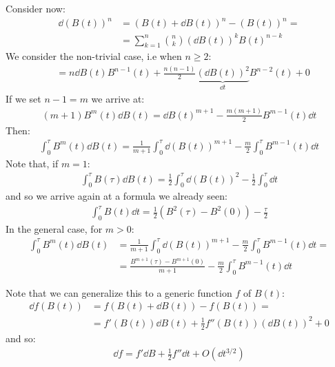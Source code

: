 \documentclass[../template.tex]{subfiles}
\begin{document}
Consider now:
\begin{align*}
    \dd{(B(t))^n} &= (B(t) + \dd{B(t)})^n - (B(t))^n =\\
    &= \sum_{k=1}^n {n\choose k} (\dd{B}(t))^k B(t)^{n-k}
\end{align*}
We consider the non-trivial case, i.e when $n\geq 2$:
\begin{align*}
    &= n \dd{B}(t) B^{n-1}(t)  + \frac{n(n-1)}{2} \underbrace{(\dd{B}(t))^2}_{\dd{t}} B^{n-2}(t) + 0  
\end{align*} 
If we set $n-1 = m$ we arrive at:
\begin{align*}
    (m+1)B^m(t) \dd{B}(t) = \dd{B(t)}^{m+1} - \frac{m(m+1)}{2} B^{m-1}(t) \dd{t} 
\end{align*} 
Then:
\begin{align*}
    \int_0^\tau B^m(t) \dd{B}(t) = \frac{1}{m+1}\int_0^\tau \dd{(B(t))^{m+1}} - \frac{m}{2} \int_0^\tau B^{m-1}(t) \dd{t}  
\end{align*}
Note that, if $m = 1$:
\begin{align*}
    \int_0^\tau B(\tau) \dd{B}(t) = \frac{1}{2} \int_0^\tau \dd{(B(t))^2} - \frac{1}{2} \int_0^\tau \dd{t}  
\end{align*}
and so we arrive again at a formula we already seen:
\begin{align*}
    \int_0^\tau B(t) \dd{t} = \frac{1}{2}(B^2(\tau) - B^2(0)) - \frac{\tau}{2}  
\end{align*}
In the general case, for $m > 0$:
\begin{align*}
    \int_0^\tau B^m(t) \dd{B}(t) &= \frac{1}{m+1} \int_0^\tau \dd{(B(t))^{m+1}} - \frac{m}{2} \int_0^\tau B^{m-1}(t) \dd{t} =\\
    &= \frac{B^{m+1}(\tau) - B^{m+1}(0)}{m+1} - \frac{m}{2} \int_0^\tau B^{m-1} (t) \dd{t}    
\end{align*} 

Note that we can generalize this to a generic function $f$ of $B(t)$:
\begin{align*}
    \dd{f(B(t))} &= f(B(t) + \dd{B}(t)) - f(B(t)) =\\
    &= f'(B(t)) \dd{B}(t) +\frac{1}{2} f''(B(t))(\dd{B(t)})^2 + 0
\end{align*}  
and so:
\begin{align*}
    \dd{f} = f' \dd{B} + \frac{1}{2} f'' \dd{t} + O(\dd{t}^{3/2}) 
\end{align*}
\end{document}
